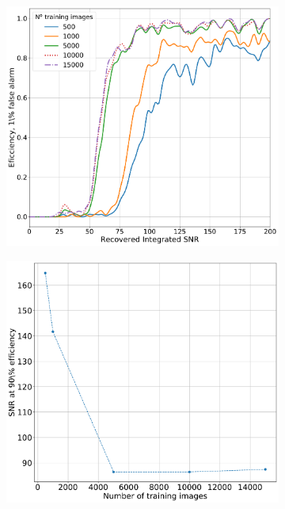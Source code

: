 \begin{figure}[h]
	\begin{subfigure}[h]{0.5\textwidth}
		\includegraphics[width=\linewidth]{C4_cnn/o1_sens_with_trainnum_eff.pdf}
		\caption{}
		\label{machine:results:sens_size:o1_sens:eff}
	\end{subfigure}
	\begin{subfigure}[h]{0.5\textwidth}
		\includegraphics[width=\linewidth]{C4_cnn/o1_sens_with_trainnum.pdf}

\end{subfigure}
\end{figure}

